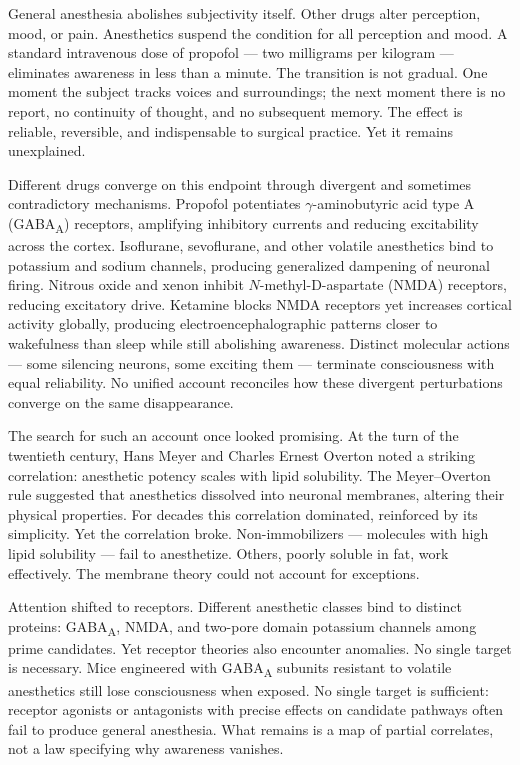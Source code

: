 General anesthesia abolishes subjectivity itself. Other drugs alter perception, mood, or pain. Anesthetics suspend the condition for all perception and mood. A standard intravenous dose of propofol — two milligrams per kilogram — eliminates awareness in less than a minute. The transition is not gradual. One moment the subject tracks voices and surroundings; the next moment there is no report, no continuity of thought, and no subsequent memory. The effect is reliable, reversible, and indispensable to surgical practice. Yet it remains unexplained.

Different drugs converge on this endpoint through divergent and sometimes contradictory mechanisms. Propofol potentiates $\gamma$-aminobutyric acid type A (GABA\textsubscript{A}) receptors, amplifying inhibitory currents and reducing excitability across the cortex. Isoflurane, sevoflurane, and other volatile anesthetics bind to potassium and sodium channels, producing generalized dampening of neuronal firing. Nitrous oxide and xenon inhibit $N$-methyl-D-aspartate (NMDA) receptors, reducing excitatory drive. Ketamine blocks NMDA receptors yet increases cortical activity globally, producing electroencephalographic patterns closer to wakefulness than sleep while still abolishing awareness. Distinct molecular actions — some silencing neurons, some exciting them — terminate consciousness with equal reliability. No unified account reconciles how these divergent perturbations converge on the same disappearance.

The search for such an account once looked promising. At the turn of the twentieth century, Hans Meyer and Charles Ernest Overton noted a striking correlation: anesthetic potency scales with lipid solubility. The Meyer–Overton rule suggested that anesthetics dissolved into neuronal membranes, altering their physical properties. For decades this correlation dominated, reinforced by its simplicity. Yet the correlation broke. Non-immobilizers — molecules with high lipid solubility — fail to anesthetize. Others, poorly soluble in fat, work effectively. The membrane theory could not account for exceptions.

Attention shifted to receptors. Different anesthetic classes bind to distinct proteins: GABA\textsubscript{A}, NMDA, and two-pore domain potassium channels among prime candidates. Yet receptor theories also encounter anomalies. No single target is necessary. Mice engineered with GABA\textsubscript{A} subunits resistant to volatile anesthetics still lose consciousness when exposed. No single target is sufficient: receptor agonists or antagonists with precise effects on candidate pathways often fail to produce general anesthesia. What remains is a map of partial correlates, not a law specifying why awareness vanishes.

